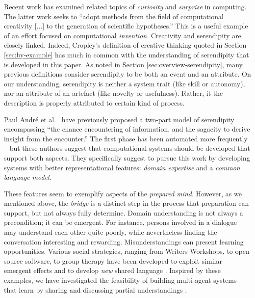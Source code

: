 Recent work has examined related topics of \emph{curiosity}
\cite{wu2013curiosity} and \emph{surprise} \cite{grace2014using} in
computing.  The latter work seeks to ``adopt methods from the field
of computational creativity [$\ldots$] to the generation of scientific hypotheses.''  This is a useful example of an effort focused on computational \emph{invention}.  
%
Creativity and serendipity are closely linked.  Indeed, Cropley's
definition of creative thinking quoted in Section
\ref{sec:by-example} has much in common with the understanding of
serendipity that is developed in this paper.  
As noted in Section \ref{sec:overview-serendipity},
many previous definitions consider serendipity to be both an event and an attribute.
%
On our understanding, serendipity is neither a system trait (like
skill or autonomy), nor an attribute of an artefact (like novelty or
usefulness).  Rather, it the description is properly attributed to
certain kind of process.

Paul Andr{\'e} et al.~\citeyear{andre2009discovery} have previously proposed a
two-part model of serendipity encompassing ``the chance encountering
of information, and the sagacity to derive insight from the
encounter.''  The first phase has been automated more frequently --
but these authors suggest that computational systems should be
developed that support both aspects.  They specifically suggest to
pursue this work by developing systems with better representational
features: \emph{domain expertise} and a \emph{common language model}.

These features seem to exemplify aspects of the \emph{prepared mind}.
However, as we mentioned above, the \emph{bridge} is a distinct step
in the process that preparation can support, but not always fully
determine.  Domain understanding is not always a precondition; it can
be emergent.  For instance, persons involved in a dialogue may
understand each other quite poorly, while nevertheless finding the
conversation interesting and rewarding.  Misunderstandings can present
learning opportunities.  Various social strategies, ranging from
Writers Workshops, to open source software, to group therapy have been
developed to exploit similar emergent effects and to develop
\emph{new} shared language \cite{gabriel2002writer,seikkula2014open}.
Inspired by these examples, we have investigated the feasibility of
building multi-agent systems that learn by sharing and discussing
partial understandings
\cite{corneli2015computational,corneli2015feedback}.

